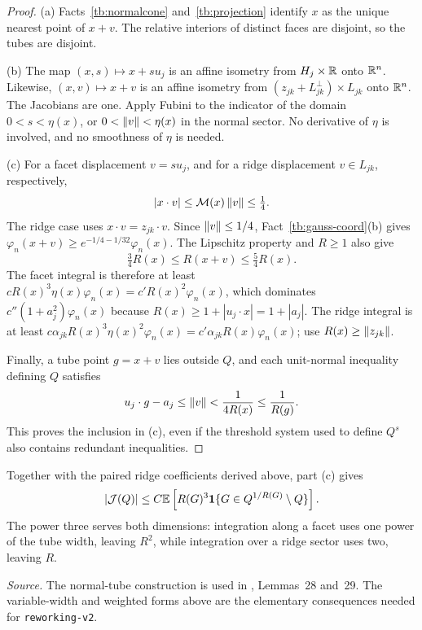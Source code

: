 \begin{proof}
(a) Facts~\ref{tb:normalcone} and~\ref{tb:projection} identify \(x\)
as the unique nearest point of \(x+v\). The relative interiors of
distinct faces are disjoint, so the tubes are disjoint.

(b) The map \((x,s)\mapsto x+s u_j\) is an affine isometry from
\(H_j\times\mathbb R\) onto \(\mathbb R^n\). Likewise, \((x,v)\mapsto x+v\)
is an affine isometry from \((z_{jk}+L_{jk}^\perp)\times L_{jk}\)
onto \(\mathbb R^n\). The Jacobians are one. Apply Fubini to the indicator
of the domain \(0<s<\eta(x)\), or \(0<\left\lVert v\right\rVert<\eta(x)\) in the
normal sector. No derivative of \(\eta\) is involved, and no
smoothness of \(\eta\) is needed.

(c) For a facet displacement \(v=s u_j\), and for a ridge displacement
\(v\in L_{jk}\), respectively,
\[
 |x\cdot v|\le\mathcal M(x)\left\lVert v\right\rVert\le\tfrac14.
\]
The ridge case uses \(x\cdot v=z_{jk}\cdot v\). Since
\(\left\lVert v\right\rVert\le1/4\), Fact~\ref{tb:gauss-coord}(b) gives
\(\varphi_n(x+v)\ge e^{-1/4-1/32}\varphi_n(x)\).
The Lipschitz property and \(R\ge1\) also give
\[
 \tfrac34R(x)\le R(x+v)\le\tfrac54R(x).
\]
The facet integral is therefore at least
\(cR(x)^3\eta(x)\varphi_n(x)=c'R(x)^2\varphi_n(x)\), which
dominates \(c''(1+a_j^2)\varphi_n(x)\) because
\(R(x)\ge1+|u_j\cdot x|=1+|a_j|\). The ridge integral is at least
\(c\alpha_{jk}R(x)^3\eta(x)^2\varphi_n(x)
=c'\alpha_{jk}R(x)\varphi_n(x)\); use
\(R(x)\ge\left\lVert z_{jk}\right\rVert\).

Finally, a tube point \(g=x+v\) lies outside \(Q\), and each
unit-normal inequality defining \(Q\) satisfies
\[
 u_j\cdot g-a_j\le\left\lVert v\right\rVert<\frac1{4R(x)}\le\frac1{R(g)}.
\]
This proves the inclusion in (c), even if the threshold system used
to define \(Q^s\) also contains redundant inequalities.
\end{proof}

Together with the paired ridge coefficients derived above, part (c)
gives
\[
 |\mathcal J(Q)|\le C\mathbb E\left[R(G)^3
              \mathbf 1\{G\in Q^{1/R(G)}\setminus Q\}\right].
\]
The power three serves both dimensions: integration along a facet
uses one power of the tube width, leaving \(R^2\), while integration
over a ridge sector uses two, leaving \(R\).

\emph{Source.} The normal-tube construction is used in ,
Lemmas~28 and~29. The variable-width and weighted forms above are
the elementary consequences needed for \texttt{reworking-v2}.

